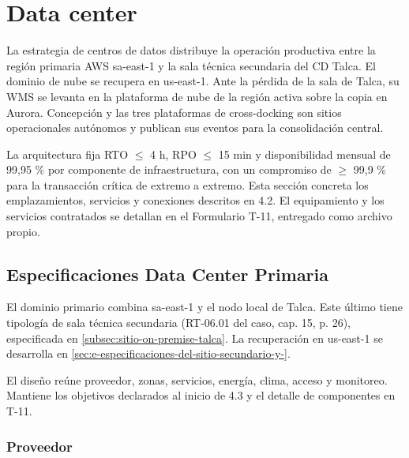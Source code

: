 %

\section{Data center}
\label{fuente-05-d-sitio-principal}
\label{cap:4-3-data-center}

La estrategia de centros de datos distribuye la operación productiva entre la región primaria AWS sa-east-1 y la sala técnica secundaria del CD Talca. El dominio de nube se recupera en us-east-1. Ante la pérdida de la sala de Talca, su WMS se levanta en la plataforma de nube de la región activa sobre la copia en Aurora. Concepción y las tres plataformas de cross-docking son sitios operacionales autónomos y publican sus eventos para la consolidación central.

La arquitectura fija RTO $\leq$ 4 h, RPO $\leq$ 15 min y disponibilidad mensual de 99,95 \% por componente de infraestructura, con un compromiso de $\geq$ 99,9 \% para la transacción crítica de extremo a extremo. Esta sección concreta los emplazamientos, servicios y conexiones descritos en 4.2. El equipamiento y los servicios contratados se detallan en el Formulario T-11, entregado como archivo propio.


\subsection{Especificaciones Data Center Primaria}
\label{sec:d-especificaciones-del-sitio-principal-on-}

El dominio primario combina sa-east-1 y el nodo local de Talca. Este último tiene tipología de sala técnica secundaria (RT-06.01 del caso, cap. 15, p. 26), especificada en \ref{subsec:sitio-on-premise-talca}. La recuperación en us-east-1 se desarrolla en \ref{sec:e-especificaciones-del-sitio-secundario-y-}.

El diseño reúne proveedor, zonas, servicios, energía, clima, acceso y monitoreo. Mantiene los objetivos declarados al inicio de 4.3 y el detalle de componentes en T-11.

\subsubsection{Proveedor}

